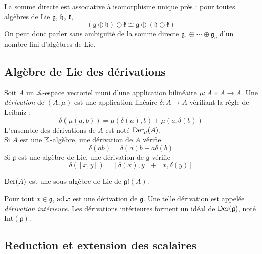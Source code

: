 \omitted

\begin{proposition}
    La somme directe est associative à isomorphisme unique près : pour toutes algèbres de Lie $\mathfrak{g}$, $\mathfrak{h}$, $\mathfrak{k}$,
    $$(\mathfrak{g} \oplus \mathfrak{h}) \oplus \mathfrak{k} \cong \mathfrak{g} \oplus (\mathfrak{h} \oplus \mathfrak{k})$$
    On peut donc parler sans ambiguïté de la somme directe $\mathfrak{g}_1 \oplus \cdots \oplus \mathfrak{g}_n$ d'un nombre fini d'algèbres de Lie.
\end{proposition}

\omitted

\subsection{Algèbre de Lie des dérivations}

\begin{definition}
    Soit $A$ un $\mathbb{K}$-espace vectoriel muni d'une application bilinéaire $\mu : A \times A \to A$. Une \emph{dérivation} de $(A, \mu)$ est une application linéaire $\delta : A \to A$ vérifiant la règle de Leibniz :
    $$\delta(\mu(a,b)) = \mu(\delta(a), b) + \mu(a, \delta(b))$$
    L'ensemble des dérivations de $A$ est noté $\operatorname{Der}_\mu(A)$. \\
    Si $A$ est une $\mathbb{K}$-algèbre, une dérivation de $A$ vérifie $$\delta(ab) = \delta(a)b + a\delta(b)$$
    Si $\mathfrak{g}$ est une algèbre de Lie, une dérivation de $\mathfrak{g}$ vérifie 
    $$\delta([x,y]) = [\delta(x), y] + [x, \delta(y)]$$
\end{definition}

\begin{proposition}
    $\operatorname{Der}(A)$ est une sous-algèbre de Lie de $\mathfrak{gl}(A)$.
\end{proposition}

\omitted

\begin{proposition}
    Pour tout $x \in \mathfrak{g}$, $\operatorname{ad} x$ est une dérivation de $\mathfrak{g}$. Une telle dérivation est appelée \emph{dérivation intérieure}. Les dérivations intérieures forment un idéal de $\operatorname{Der}(\mathfrak{g})$, noté $\mathrm{Int}(\mathfrak{g})$.
\end{proposition}

\omitted

\subsection{Reduction et extension des scalaires}

